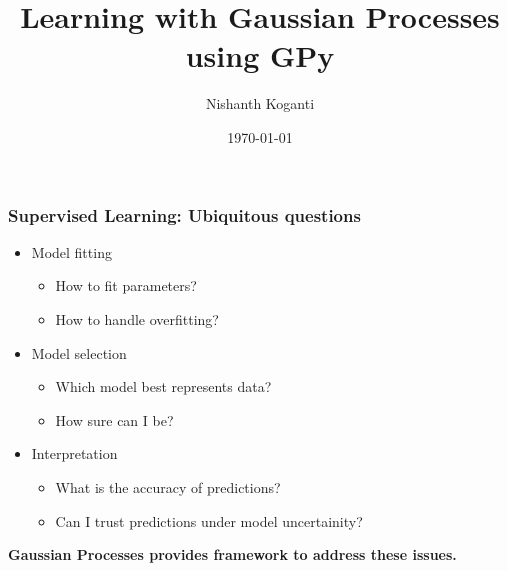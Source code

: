 \documentclass[10pt]{beamer}
\title{Learning with Gaussian Processes using GPy}
\author{Nishanth Koganti}
\date{\today}
\begin{document}
  \begin{frame}[noframenumbering]
    \titlepage
  \end{frame}

  \begin{frame}
    \frametitle{Supervised Learning: Ubiquitous questions}

    \begin{itemize}
      \item Model fitting
      \begin{itemize}
        \item How to fit parameters?
        \item How to handle overfitting?
      \end{itemize}

      \item Model selection
      \begin{itemize}
        \item Which model best represents data?
        \item How sure can I be?
      \end{itemize}

      \item Interpretation
      \begin{itemize}
        \item What is the accuracy of predictions?
        \item Can I trust predictions under model uncertainity?
      \end{itemize}
    \end{itemize}

    \begin{center}
      \textbf{Gaussian Processes provides framework to address these issues.}
    \end{center}
  \end{frame}
\end{document}

